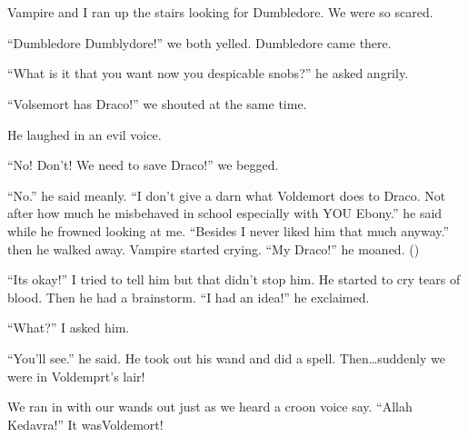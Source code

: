 \section{}


\XXX{\Xfill 666\Xfill}

Vampire and I ran up the stairs looking for Dumbledore. We were so scared.

\begin{sloppypar}
    \enquote{Dumbledore Dumblydore!} we both yelled. Dumbledore came there.
\end{sloppypar}

\enquote{What is it that you want now you despicable snobs?} he asked angrily.

\enquote{Volsemort has Draco!} we shouted at the same time.

He laughed in an evil voice.

\enquote{No! Don't! We need to save Draco!} we begged.

\enquote{No.} he said meanly. \enquote{I don't give a darn what Voldemort does to Draco. Not after how much he misbehaved in school especially with YOU Ebony.} he said while he frowned looking at me. \enquote{Besides I never liked him that much anyway.} then he walked away. Vampire started crying. \enquote{My Draco!} he moaned. ()

\enquote{Its okay!} I tried to tell him but that didn't stop him. He started to cry tears of blood. Then he had a brainstorm. \enquote{I had an idea!} he exclaimed.

\enquote{What?} I asked him.

\enquote{You'll see.} he said. He took out his wand and did a spell. Then\ldots suddenly we were in Voldemprt's lair!

We ran in with our wands out just as we heard a croon voice say. \enquote{Allah Kedavra!}
It was\dotfill Voldemort!
